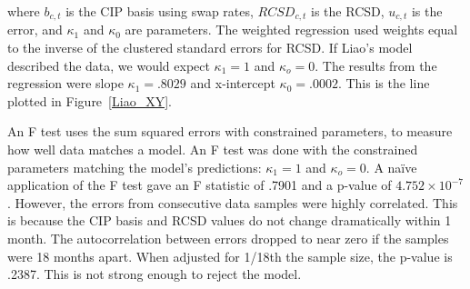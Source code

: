 \noindent where $b_{c,t}$ is the CIP basis using swap rates, $RCSD_{c,t}$ is the RCSD, $u_{c,t}$ is the error, and $\kappa_1$ and $\kappa_0$ are parameters.  The weighted regression used weights equal to the inverse of the clustered standard errors for RCSD.  If Liao's model described the data, we would expect $\kappa_1=1$ and $\kappa_o=0$.  The results from the regression were slope $\kappa_1=.8029$ and x-intercept $\kappa_0=.0002$.  This is the line plotted in Figure~\ref{Liao_XY}.

An F test uses the sum squared errors with constrained parameters, to measure how well data matches a model.   An F test was done with the constrained parameters matching the model's predictions: $\kappa_1=1$ and $\kappa_o=0$.  A na\"ive application of the F test gave an F statistic of .7901 and a p-value of $4.752\times 10^{-7}$.  However, the errors from consecutive data samples were highly correlated.  This is because the CIP basis and RCSD values do not change dramatically within 1 month.  The autocorrelation between errors dropped to near zero if the samples were 18 months apart.  When adjusted for 1/18th the sample size, the p-value is .2387.  This is not strong enough to reject the model. 



\clearpage




\newcommand{\comparefig}[2]{
\begin{figure}[H]  %
\textbf{\caption{\label{Liao_#1} Residualized credit spread diff. of #1}}
\noindent \textbf{Panel A:} \newline
\texttt{[image: images/Liao2016Figure4\_\#1\_xcbs]}
\noindent \textbf{Panel B:} \newline
\texttt{[image: images/Liao2016Figure4\_\#1\_orig]}
Note: {\small Panel A is from this work and Panel B is from Liao's.  Liao's plot has been shifted to the right in order to align the dates for easier comparison.  The RCSD is plotted in blue (dotted) with the 95\% confidence interval in gray.  CIP basis using swaps with a 5-year horizon is in red (solid). #2}
\newline \noindent Source: (Panel B only) Liao(2016)\cite{Liao2016}
\end{figure}
}

